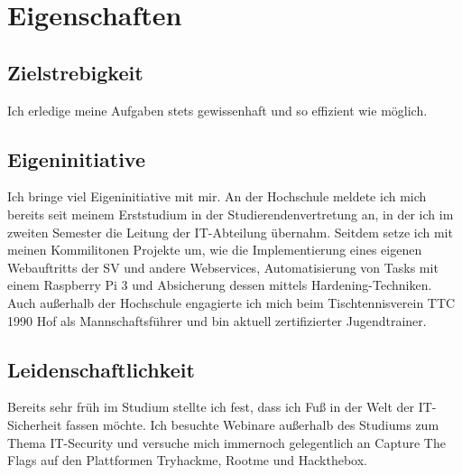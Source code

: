 \section{Eigenschaften}\label{sec: eigenschaften}

\subsection{Zielstrebigkeit}\label{subsec: zielstrebigkeit}
Ich erledige meine Aufgaben stets gewissenhaft und so effizient wie möglich.

\subsection{Eigeninitiative}\label{subsec: eigeninitiative}

Ich bringe viel Eigeninitiative mit mir.
An der Hochschule meldete ich mich bereits seit meinem Erststudium in der Studierendenvertretung an,
in der ich im zweiten Semester die Leitung der IT-Abteilung übernahm.
Seitdem setze ich mit meinen Kommilitonen Projekte um, wie die Implementierung eines eigenen Webauftritts der SV und andere Webservices,
Automatisierung von Tasks mit einem Raspberry Pi 3 und Absicherung dessen mittels Hardening-Techniken. \newline
Auch außerhalb der Hochschule engagierte ich mich beim Tischtennisverein TTC 1990 Hof als Mannschaftsführer und bin aktuell zertifizierter Jugendtrainer.

\subsection{Leidenschaftlichkeit}\label{subsec: leidenschaftlichkeit}
Bereits sehr früh im Studium stellte ich fest, dass ich Fuß in der Welt der IT-Sicherheit fassen möchte.
Ich besuchte Webinare außerhalb des Studiums zum Thema IT-Security und versuche mich
immernoch gelegentlich an Capture The Flags auf den Plattformen Tryhackme, Rootme und Hackthebox.
